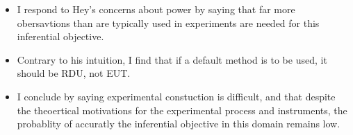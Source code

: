 \documentclass[12pt,a4paper]{article}\usepackage[]{graphicx}\usepackage[]{color}
\begin{document}
\begin{itemize}
\begin{itemize}
			\end{itemize}
		\item I respond to Hey's concerns about power by saying that far more obersavtions than are typically used in experiments are needed for this inferential objective.
		\item Contrary to his intuition, I find that if a default method is to be used, it should be RDU, not EUT.
		\item I conclude by saying experimental constuction is difficult, and that despite the theoertical motivations for the experimental process and instruments, the probablity of accuratly the inferential objective in this domain remains low.
	\end{itemize}









\newpage

\printbibliography
\end{document}
